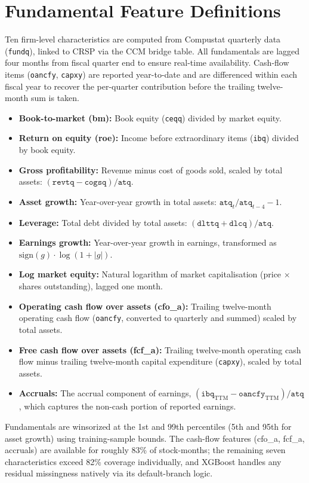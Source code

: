 \section{Fundamental Feature Definitions}\label{app:fundamental_features}

Ten firm-level characteristics are computed from Compustat quarterly data (\texttt{fundq}), linked to CRSP via the CCM bridge table. All fundamentals are lagged four months from fiscal quarter end to ensure real-time availability. Cash-flow items (\texttt{oancfy}, \texttt{capxy}) are reported year-to-date and are differenced within each fiscal year to recover the per-quarter contribution before the trailing twelve-month sum is taken.

\begin{itemize}
    \item \textbf{Book-to-market (bm):} Book equity (\texttt{ceqq}) divided by market equity.
    \item \textbf{Return on equity (roe):} Income before extraordinary items (\texttt{ibq}) divided by book equity.
    \item \textbf{Gross profitability:} Revenue minus cost of goods sold, scaled by total assets: $(\texttt{revtq} - \texttt{cogsq}) / \texttt{atq}$.
    \item \textbf{Asset growth:} Year-over-year growth in total assets: $\texttt{atq}_t / \texttt{atq}_{t-4} - 1$.
    \item \textbf{Leverage:} Total debt divided by total assets: $(\texttt{dlttq} + \texttt{dlcq}) / \texttt{atq}$.
    \item \textbf{Earnings growth:} Year-over-year growth in earnings, transformed as $\text{sign}(g) \cdot \log(1 + |g|)$.
    \item \textbf{Log market equity:} Natural logarithm of market capitalisation (price $\times$ shares outstanding), lagged one month.
    \item \textbf{Operating cash flow over assets (cfo\_a):} Trailing twelve-month operating cash flow (\texttt{oancfy}, converted to quarterly and summed) scaled by total assets.
    \item \textbf{Free cash flow over assets (fcf\_a):} Trailing twelve-month operating cash flow minus trailing twelve-month capital expenditure (\texttt{capxy}), scaled by total assets.
    \item \textbf{Accruals:} The accrual component of earnings, $(\texttt{ibq}_{\text{TTM}} - \texttt{oancfy}_{\text{TTM}}) / \texttt{atq}$, which captures the non-cash portion of reported earnings.
\end{itemize}

Fundamentals are winsorized at the 1st and 99th percentiles (5th and 95th for asset growth) using training-sample bounds. The cash-flow features (cfo\_a, fcf\_a, accruals) are available for roughly 83\% of stock-months; the remaining seven characteristics exceed 82\% coverage individually, and XGBoost handles any residual missingness natively via its default-branch logic.

